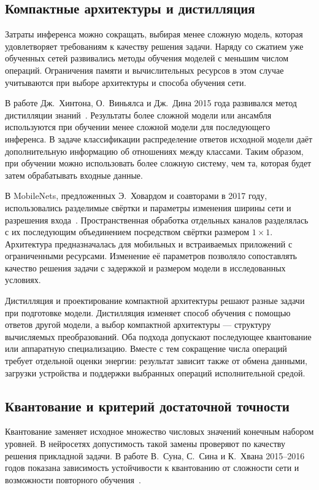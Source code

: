 \subsection{Компактные архитектуры и дистилляция}

Затраты инференса можно сокращать, выбирая менее сложную модель, которая
удовлетворяет требованиям к качеству решения задачи. Наряду со сжатием уже
обученных сетей развивались методы обучения моделей с меньшим числом операций.
Ограничения памяти и вычислительных ресурсов в этом случае учитываются при
выборе архитектуры и способа обучения сети.

В работе Дж.~Хинтона, О.~Виньялса и Дж.~Дина 2015 года
развивался метод дистилляции знаний~\cite{hinton2015distillation}.
Результаты более сложной модели или ансамбля используются
при обучении менее сложной модели для последующего инференса. В задаче
классификации распределение ответов исходной модели даёт дополнительную
информацию об отношениях между классами. Таким образом, при обучении можно
использовать более сложную систему, чем та, которая будет затем обрабатывать
входные данные.

В MobileNets, предложенных Э.~Ховардом и соавторами в 2017 году,
использовались разделимые свёртки и параметры изменения ширины
сети и разрешения входа~\cite{howard2017mobilenets}.
Пространственная обработка отдельных каналов разделялась
с их последующим объединением посредством свёртки размером $1\times1$.
Архитектура предназначалась для мобильных и встраиваемых
приложений с ограниченными ресурсами. Изменение её параметров
позволяло сопоставлять качество решения задачи с задержкой
и размером модели в исследованных условиях.

Дистилляция и проектирование компактной архитектуры решают разные задачи при
подготовке модели. Дистилляция изменяет способ обучения с помощью ответов
другой модели, а выбор компактной архитектуры — структуру вычисляемых
преобразований. Оба подхода допускают последующее
квантование или аппаратную специализацию. Вместе с тем
сокращение числа операций требует отдельной оценки энергии:
результат зависит также от обмена данными, загрузки устройства
и поддержки выбранных операций исполнительной средой.

\subsection{Квантование и критерий достаточной точности}

Квантование заменяет исходное множество числовых значений конечным
набором уровней. В нейросетях допустимость такой замены проверяют
по качеству решения прикладной задачи.
В работе В.~Суна, С.~Сина и К.~Хвана 2015--2016 годов показана
зависимость устойчивости к квантованию от сложности сети
и возможности повторного обучения~\cite{sung2016}.

